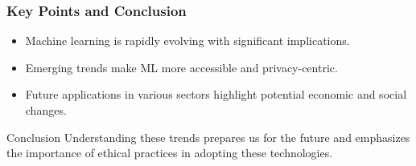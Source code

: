 \documentclass{beamer}
\begin{document}
\begin{frame}[fragile]
    \frametitle{Key Points and Conclusion}
    \begin{itemize}
        \item Machine learning is rapidly evolving with significant implications.
        \item Emerging trends make ML more accessible and privacy-centric.
        \item Future applications in various sectors highlight potential economic and social changes.
    \end{itemize}

    \begin{block}{Conclusion}
        Understanding these trends prepares us for the future and emphasizes the importance of ethical practices in adopting these technologies.
    \end{block}
\end{frame}
\end{document}
